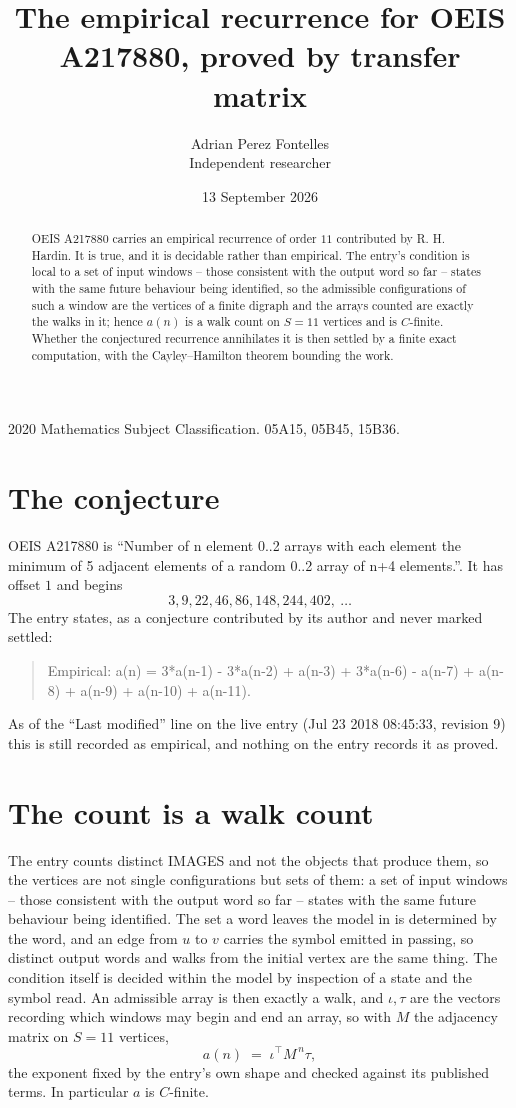 \documentclass[11pt,a4paper]{article}
\title{The empirical recurrence for OEIS A217880, proved by transfer matrix}
\author{Adrian Perez Fontelles\\ \small Independent researcher}
\date{13 September 2026}
\theoremstyle{plain}
\theoremstyle{definition}
\begin{document}
\maketitle

\begin{abstract}
OEIS A217880 carries an empirical recurrence of order $11$ contributed by R. H. Hardin. It is
true, and it is decidable rather than empirical. The entry's condition is local to a set of input windows -- those consistent with the output word so far -- states with the same future behaviour being identified, so
the admissible configurations of such a window are the vertices of a finite digraph and the
arrays counted are exactly the walks in it; hence $a(n)$ is a walk count on $S=11$ vertices
and is $C$-finite. Whether the conjectured recurrence annihilates it is then settled by a
finite exact computation, with the Cayley--Hamilton theorem bounding the work.
\end{abstract}

\noindent\small 2020 Mathematics Subject Classification. 05A15, 05B45, 15B36.\normalsize

\section{The conjecture}

OEIS A217880 is ``Number of n element 0..2 arrays with each element the minimum of 5 adjacent elements of a random 0..2 array of n+4 elements.''. It has offset $1$ and begins
\[
3, 9, 22, 46, 86, 148, 244, 402,\ \dots
\]
The entry states, as a conjecture contributed by its author and never marked settled:
\begin{quote}
Empirical: a(n) = 3*a(n-1) - 3*a(n-2) + a(n-3) + 3*a(n-6) - a(n-7) + a(n-8) + a(n-9) + a(n-10) + a(n-11).
\end{quote}
As of the ``Last modified'' line on the live entry (Jul 23 2018 08:45:33, revision 9) this is still
recorded as empirical, and nothing on the entry records it as proved.

\section{The count is a walk count}

The entry counts distinct IMAGES and not the objects that produce them, so the vertices are not single configurations but sets of them: a set of input windows -- those consistent with the output word so far -- states with the same future behaviour being identified. The set a word leaves the model in is determined by the word, and an edge from $u$ to $v$ carries the symbol emitted in passing, so distinct output words and walks from the initial vertex are the same thing. The condition itself is decided within the model by inspection of a state and the symbol read.
An admissible array is then exactly a walk, and $\iota,\tau$ are the vectors recording which windows may begin and end an array, so with $M$ the adjacency matrix on $S=11$ vertices,
\[
a(n)\;=\;\iota^{\!\top}M^{\,n}\tau ,
\]
the exponent fixed by the entry's own shape and checked against its published terms. In
particular $a$ is $C$-finite.
\end{document}
